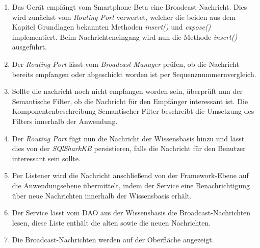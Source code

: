 \begin{enumerate}
	\item Das Gerät empfängt vom Smartphone Beta eine Broadcast-Nachricht. Dies wird zunächst vom \textit{Routing Port} verwertet, welcher die beiden aus dem Kapitel Grundlagen bekannten Methoden \textit{insert()} und \textit{expose()} implementiert. Beim Nachrichteneingang wird nun die Methode \textit{insert()} ausgeführt.
	\item Der \textit{Routing Port} lässt vom \textit{Broadcast Manager} prüfen, ob die Nachricht bereits empfangen oder abgeschickt worden ist per Sequenznummernvergleich.
	\item Sollte die nachricht noch nicht empfangen worden sein, überprüft nun der Semantische Filter, ob die Nachricht für den Empfänger interessant ist. Die Komponentenbeschreibung Semantischer Filter beschreibt die Umsetzung des Filters innerhalb der Anwendung. 
	\item Der \textit{Routing Port} fügt nun die Nachricht der Wissensbasis hinzu und lässt dies von der \textit{SQlSharkKB} persistieren, falls die Nachricht für den Benutzer interessant sein sollte.
	\item Per Listener wird die Nachricht anschließend von der Framework-Ebene auf die Anwendungsebene übermittelt, indem der Service eine Benachrichtigung über neue Nachrichten innerhalb der Wissensbasis erhält. 
	\item Der Service lässt vom DAO aus der Wissensbasis die Broadcast-Nachrichten lesen, diese Liste enthält die alten sowie die neuen Nachrichten.
	\item Die Broadcast-Nachrichten werden auf der Oberfläche angezeigt.
\end{enumerate}

